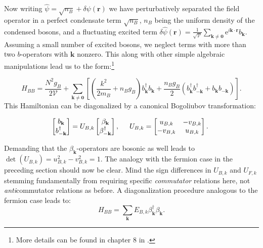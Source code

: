 Now writing $\hat{\psi} = \sqrt{n_B} + \delta \psi(\mathbf{r})$ we have perturbatively separated the field operator in a perfect condensate term $\sqrt{n_B}$, $n_B$ being the uniform density of the condensed bosons, and a fluctuating excited term $\delta \hat{\psi}(\mathbf{r}) =  \frac{1}{\sqrt{\mathcal{V}}}\sum_{\mathbf{k}\neq \mathbf{0}} \text{e}^{i\mathbf{k}\cdot\mathbf{r}}b_\mathbf{k}$. Assuming a small number of excited bosons, we neglect terms with more than two $b$-operators with $\mathbf{k}$ nonzero. This along with other simple algebraic manipulations lead us to the form:\footnote{More details can be found in chapter 8 in \cite{Pethick}.} 

\begin{equation}
H_{BB} = \frac{N^2g_B}{2\mathcal{V}} + \sum_{\mathbf{k}\neq \mathbf{0}}\left[\left(\frac{k^2}{2m_B}+n_Bg_B\right)b_\mathbf{k}^\dagger b_\mathbf{k} + \frac{n_Bg_B}{2}\left( b_\mathbf{k}^\dagger b_{-\mathbf{k}}^\dagger + b_{\mathbf{k}} b_{-\mathbf{k}} \right) \right].
\label{eq.bosonHamiltonian}
\end{equation}
This Hamiltonian can be diagonalized by a canonical Bogoliubov transformation:

\begin{equation}
\begin{bmatrix} b_\mathbf{k} \\ b^\dagger_{-\mathbf{k}} \end{bmatrix} = U_{B,k} \begin{bmatrix} \beta_\mathbf{k} \\ \beta^\dagger_{-\mathbf{k}}\end{bmatrix}, \hspace{0.5cm} U_{B,k} = \begin{bmatrix} u_{B,k} & -v_{B,k} \\ -v_{B,k} & u_{B,k} \end{bmatrix}. 
\end{equation}

Demanding that the $\beta_\mathbf{k}$-operators are bosonic as well leads to $\det(U_{B,k}) = u_{B,k}^2-v_{B,k}^2=1$. The analogy with the fermion case in the preceding section should now be clear. Mind the sign differences in $U_{B,k}$ and $U_{F,k}$ stemming fundamentally from requiring specific \textit{commutator} relations here, not \textit{anti}commutator relations as before. A diagonalization procedure analogous to the fermion case leads to: 
\begin{equation}
H_{BB} = \sum_\mathbf{k} E_{B,k} \beta_\mathbf{k}^\dagger \beta_\mathbf{k}. 
\end{equation}

